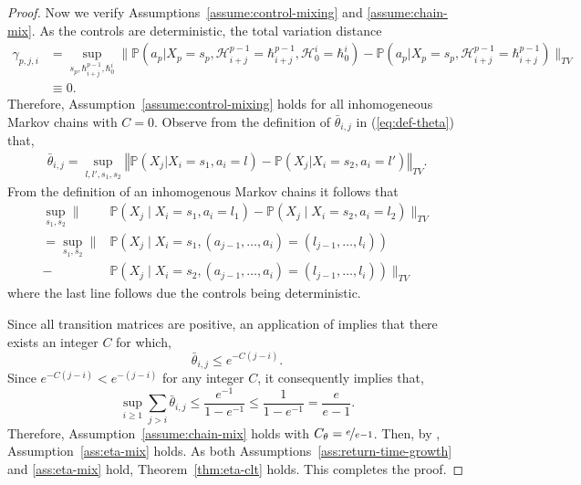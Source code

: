 \documentclass[twoside,11pt]{article}
\numberwithin{equation}{section}
\newcommand{\lp}{\left(}
\newcommand{\rp}{\right)}
\newcommand{\History}{\mathcal{H}}
\newcommand{\history}{\hbar}
\newcommand{\Pbb}{\mathbb{P}}
\newcommand{\prob}{\Pbb}
\newcommand{\probl}{\prob}
\newcommand{\nrm}[1]{\left\Vert #1 \right\Vert}
\begin{document}
\begin{proof}
Now we verify Assumptions~\ref{assume:control-mixing} and \ref{assume:chain-mix}.
As the controls are deterministic, the total variation distance 
\begin{align*}
\gamma_{p,j,i} & = 
    \sup_{s_p, \history_{i+j}^{p-1}, \history_0^i} 
    \Big\lVert 
        \probl\lp 
            a_p \Big| X_p = s_p, \History_{i+j}^{p-1} = \history_{i+j}^{p-1}, \History_0^i = \history_{0}^i
        \rp - 
        \probl\lp  
            a_p \Big| X_p = s_p, \History_{i+j}^{p-1} = \history_{i+j}^{p-1}
        \rp
    \Big\rVert_{TV} \\
    & \equiv 0.
\end{align*}
Therefore, Assumption~\ref{assume:control-mixing} holds for all inhomogeneous Markov chains with $C=0$. Observe from the definition of $\bar \theta_{i,j}$ in (\ref{eq:def-theta}) that,
\begin{align*}
\bar \theta_{i,j} =\sup_{l,l',s_1,s_2} \nrm{\probl\lp X_j|X_i=s_1,a_i=l \rp-\probl\lp X_j|X_i=s_2,a_i=l'\rp}_{TV}.
\end{align*}
From the definition of an inhomogenous Markov chains it follows that 
\begin{align*}
    \sup_{s_1, s_2} \bigg\| 
    & \probl \lp X_j \mid X_i = s_1, a_i = l_1\rp 
    - \probl \lp X_j \mid X_i = s_2, a_i = l_2\rp \bigg\|_{TV} \\
    = \sup_{s_1, s_2} \bigg\| 
    & \probl \lp X_j \mid X_i = s_1, (a_{j-1}, \dots, a_i) = (l_{j-1}, \dots, l_i)\rp \\
    - & \probl \lp X_j \mid X_i = s_2, (a_{j-1}, \dots, a_i) = (l_{j-1}, \dots, l_i)\rp 
    \bigg\|_{TV}
\end{align*}
where the last line follows due the controls being deterministic. 

Since all transition matrices are positive, an application of \citet[Theorem 1]{wolfowitz1963products} implies that there exists an integer $C$ for which, 
\[
\bar \theta_{i,j}\leq e^{-C(j-i)}.
\]
Since $e^{-C(j-i)}<e^{-(j-i)}$ for any integer $C$, it consequently implies that,
\[
\sup_{i\geq 1}\sum_{j >i} \bar \theta_{i,j}\leq \frac{e^{-1}}{1-e^{-1}}\leq \frac{1}{1-e^{-1}} = \frac{e}{e-1}. 
\]
Therefore, Assumption~\ref{assume:chain-mix} holds with $C_\theta = \nicefrac{e}{e-1}$. 
Then, by \citet[Lemma 3]{banerjee2025off}, Assumption~\ref{ass:eta-mix} holds. 
As both Assumptions~\ref{ass:return-time-growth} and \ref{ass:eta-mix} hold, Theorem~\ref{thm:eta-clt} holds.
This completes the proof.
\end{proof}
\end{document}
